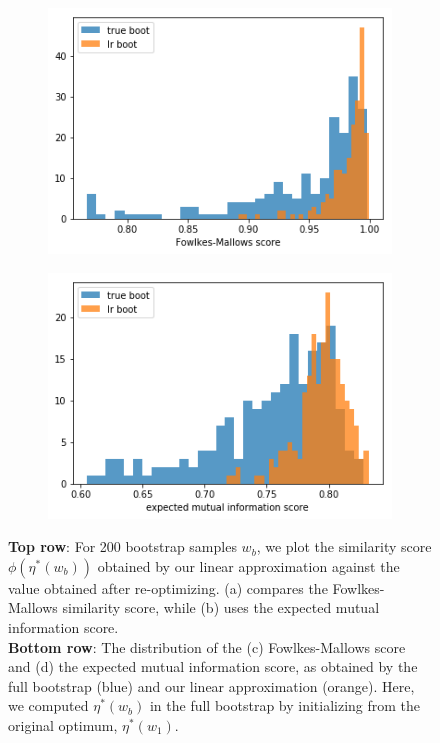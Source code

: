 \documentclass[a4paper]{article}
\begin{document}
\begin{figure}[h!]
\begin{subfigure}[t]{0.4\textwidth}
		\includegraphics[width = \textwidth]{./data_sens_figs/hist_fm_score.png}
		\subcaption{}
	\end{subfigure}
	\begin{subfigure}[t]{0.4\textwidth}
		\includegraphics[width = \textwidth]{./data_sens_figs/hist_emi_score.png}
		\subcaption{}
	\end{subfigure}
	\caption{{\bf Top row}: For 200 bootstrap samples $w_b$, we plot the similarity score
	$\phi(\eta^*(w_b))$ obtained by our linear approximation against
  the value obtained after re-optimizing. (a) compares the Fowlkes-Mallows similarity score,
	while (b) uses the expected mutual information score.\\
	{\bf Bottom row}: The distribution of the (c) Fowlkes-Mallows score and (d) the expected mutual information score, as obtained by
  the full bootstrap (blue) and our linear approximation (orange). Here, we computed $\eta^*(w_b)$ in the full bootstrap
  by initializing from
  the original optimum, $\eta^*(w_1)$. }
  \label{fig:bs_vs_lr_diff}
\end{figure}
\end{document}
